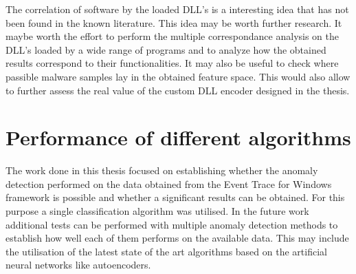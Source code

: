 \documentclass[a4paper,twoside,12pt]{book}
\newcounter{PagesWithoutNumbers}
\begin{document}
The correlation of software by the loaded DLL's is a interesting idea that has not been
found in the known literature. This idea may be worth further research. It maybe worth
the effort to perform the multiple correspondance analysis on the DLL's loaded by a wide range 
of programs and to analyze how the obtained results correspond to their functionalities. It may also
be useful to check where passible malware samples lay in the obtained feature space. This would also
allow to further assess the real value of the custom DLL encoder designed in the thesis. 

\section{Performance of different algorithms}

The work done in this thesis focused on establishing whether the anomaly detection performed on the
data obtained from the Event Trace for Windows framework is possible and whether a significant results
can be obtained. For this purpose a single classification algorithm was utilised. In the future work 
additional tests can be performed with multiple anomaly detection methods to establish how well each 
of them performs on the available data. This may include the utilisation of the latest state of the 
art algorithms based on the artificial neural networks like autoencoders.






\backmatter
{}
\setcounter{page}{\value{PagesWithoutNumbers}}

\pagestyle{onlyPageNumbers}




\end{document}
